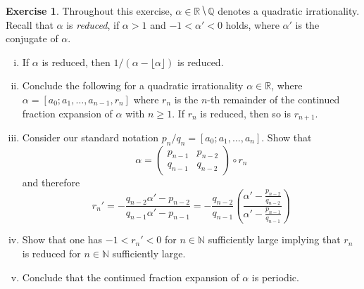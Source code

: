 \documentclass[12pt,a4paper]{article}
\theoremstyle{plain}
\newtheorem*{Sol*}{Solution}
\theoremstyle{definition}
\newtheorem{Ex}{Exercise}
\newif\ifsolutions
\newcommand{\exercise}[2]{
			\begin{Ex} #1 \end{Ex}
			\ifsolutions  \begin{Sol*} #2 \end{Sol*} \bigskip \else \bigskip  \fi
		}
\begin{document}
\exercise{Throughout this exercise, $α ∈ ℝ ⧹ℚ$ denotes a quadratic irrationality. 
  Recall that  $α$ is \emph{reduced}, if $α>1$ and $-1 < α'<0$ holds, where $α'$ is the conjugate of $α$.
  \begin{enumerate}[i)] 
  \item If  $α$ is reduced, then $1 / (α - ⌊α⌋)$ is reduced.
  \item Conclude the following for a quadratic irrationality $α ∈ ℝ$, where $α = [a_0 ; a_1, \dots, a_{n-1}, r_n]$ where $r_n$ is the $n$-th remainder of the continued fraction expansion of $α$ with $n≥1$. If $r_n$ is reduced, then so is $r_{n+1}$.
  \item Consider our standard notation $p_{n}/ q_n = [a_0;a_1,\dots,a_n]$. 
    Show that
    \begin{displaymath}
      α =
      \begin{pmatrix}
        p_{n-1} & p_{n-2} \\
        q_{n-1} & q_{n-2} 
      \end{pmatrix} \circ r_n
    \end{displaymath}
    and therefore
    \begin{displaymath}
      r_n ' = - \frac{q_{n-2} α' - p_{n-2}}{ q_{n-1} α' - p_{n-1}} = - \frac{q_{n-2}}{q_{n-1}} \left( \frac{α' - \frac{p_{n-2}}{ q_{n-2}}}{α' - \frac{p_{n-1} }{ q_{n-1}} }\right)
    \end{displaymath}
  \item Show that one has $-1 < r_n' <0$  for $n ∈ ℕ$  sufficiently large implying that $r_n$ is reduced for $n ∈ ℕ$  sufficiently large.
    \item Conclude that the continued fraction  expansion of $α $  is periodic. 
  \end{enumerate}
}{
	\begin{enumerate}
		\item Let $\beta = 1/(\alpha - \lfloor \alpha \rfloor)$. Clearly $\beta$ is a quadratic irrationality, and $\beta > 1$.
		Next, $\beta' = 1/(\alpha' - \lfloor \alpha \rfloor)$. One has $-1 < \beta < 0$ since
			\[ \alpha' < 0 < 1 \leq \lfloor \alpha \rfloor. \]
	
		\item This follows directly from i) since $r_n = a_n + \frac{1}{r_{n+1}}$ where $a_n = \lfloor r_n \rfloor$.

		\item This was shown by induction in set 3, with notation $x_n$ instead of $r_n$.
		Expressing $r_n$ w.r.t. $\alpha$ by inverting the matrix and taking conjugates on both sides yields the required relation for $r_n'$.


\end{enumerate}}
\end{document}
